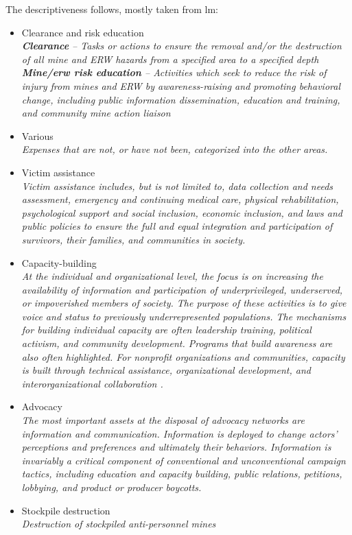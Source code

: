 The descriptiveness follows, mostly taken from \gls{lm}: 
\begin{itemize}
\setlength{\itemsep}{0.05\baselineskip}
    \item Clearance and risk education\\
    \textit{\textbf{Clearance} – Tasks or actions to ensure the removal and/or the destruction of all mine and ERW hazards from a specified area to a specified depth\\
    \textbf{Mine/\gls{erw} risk education} – Activities which seek to reduce the risk of injury from mines and  ERW by awareness-raising and  promoting behavioral  change, including public information dissemination, education and training, and community mine action liaison}
    \item Various\\
    \textit{Expenses that are not, or have not been, categorized into the other areas.}
    \item Victim assistance\\
    \textit{Victim assistance includes, but is not limited to, data collection and needs assessment, emergency and continuing medical care, physical rehabilitation, psychological support and social inclusion, economic inclusion, and laws and public policies to ensure the full and equal integration and participation of survivors, their families, and communities in society.}
    \item Capacity-building\\
    \textit{At the individual and organizational level, the focus is on increasing the availability of information and participation of underprivileged, underserved, or impoverished members of society. The purpose of these activities is to give voice and status to previously underrepresented populations. The mechanisms for building individual capacity are often leadership training, political activism, and community development. Programs that build awareness are also often highlighted. For nonprofit organizations and communities, capacity is built through technical assistance, organizational development, and interorganizational collaboration \cite{EB:capacity-building}.}
    \item Advocacy\\
    \textit{The most important assets at the disposal of advocacy networks are information and communication. Information is deployed to change actors’ perceptions and preferences and ultimately their behaviors. Information is invariably a critical component of conventional and unconventional campaign tactics, including education and capacity building, public relations, petitions, lobbying, and product or producer boycotts\cite{EB:advocacy-networking}.}
    \item Stockpile destruction\\
    \textit{Destruction of stockpiled anti-personnel mines}
\end{itemize}